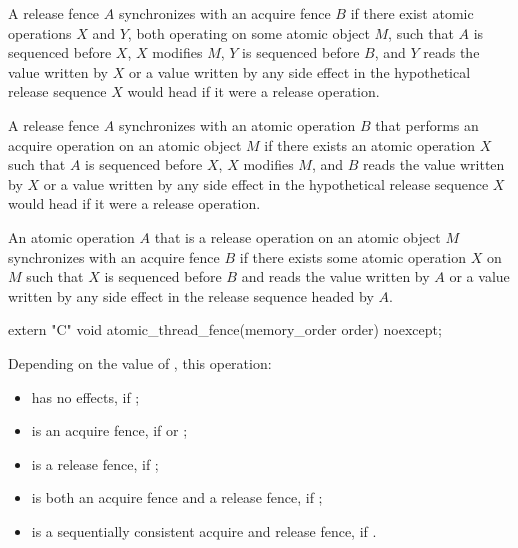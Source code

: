 \pnum
A release fence $A$ synchronizes with an acquire fence $B$ if there exist
atomic operations $X$ and $Y$, both operating on some atomic object
$M$, such that $A$ is sequenced before $X$, $X$ modifies
$M$, $Y$ is sequenced before $B$, and $Y$ reads the value
written by $X$ or a value written by any side effect in the hypothetical release
sequence $X$ would head if it were a release operation.

\pnum
A release fence $A$ synchronizes with an atomic operation $B$ that
performs an acquire operation on an atomic object $M$ if there exists an atomic
operation $X$ such that $A$ is sequenced before $X$, $X$
modifies $M$, and $B$ reads the value written by $X$ or a value
written by any side effect in the hypothetical release sequence $X$ would head if
it were a release operation.

\pnum
An atomic operation $A$ that is a release operation on an atomic object
$M$ synchronizes with an acquire fence $B$ if there exists some atomic
operation $X$ on $M$ such that $X$ is sequenced before $B$
and reads the value written by $A$ or a value written by any side effect in the
release sequence headed by $A$.

%
\begin{itemdecl}
extern "C" void atomic_thread_fence(memory_order order) noexcept;
\end{itemdecl}

\begin{itemdescr}
\pnum
\effects
Depending on the value of , this operation:
\begin{itemize}
\item has no effects, if ;

\item is an acquire fence, if  or ;

\item is a release fence, if ;

\item is both an acquire fence and a release fence, if ;

\item is a sequentially consistent acquire and release fence, if .
\end{itemize}
\end{itemdescr}

